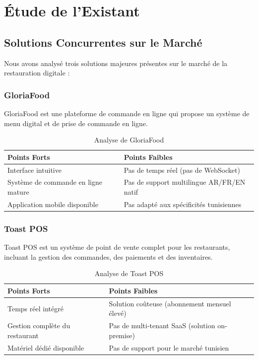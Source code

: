 \documentclass[12pt,a4paper]{report}
\begin{document}
\section{Étude de l'Existant}

\subsection{Solutions Concurrentes sur le Marché}

Nous avons analysé trois solutions majeures présentes sur le marché de la restauration digitale :

\subsubsection{GloriaFood}

GloriaFood est une plateforme de commande en ligne qui propose un système de menu digital et de prise de commande en ligne.

\begin{table}[H]
    \centering
    \begin{tabularx}{\textwidth}{l X}
        \toprule
        \rowcolor{primary!10}
        \textbf{Points Forts} & \textbf{Points Faibles} \\
        \midrule
        Interface intuitive & Pas de temps réel (pas de WebSocket) \\
        Système de commande en ligne mature & Pas de support multilingue AR/FR/EN natif \\
        Application mobile disponible & Pas adapté aux spécificités tunisiennes \\
        \bottomrule
    \end{tabularx}
    \caption{Analyse de GloriaFood}
    \label{tab:gloriafood}
\end{table}

\subsubsection{Toast POS}

Toast POS est un système de point de vente complet pour les restaurants, incluant la gestion des commandes, des paiements et des inventaires.

\begin{table}[H]
    \centering
    \begin{tabularx}{\textwidth}{l X}
        \toprule
        \rowcolor{secondary!10}
        \textbf{Points Forts} & \textbf{Points Faibles} \\
        \midrule
        Temps réel intégré & Solution coûteuse (abonnement mensuel élevé) \\
        Gestion complète du restaurant & Pas de multi-tenant SaaS (solution on-premise) \\
        Matériel dédié disponible & Pas de support pour le marché tunisien \\
        \bottomrule
    \end{tabularx}
    \caption{Analyse de Toast POS}
    \label{tab:toast}
\end{table}
\end{document}
